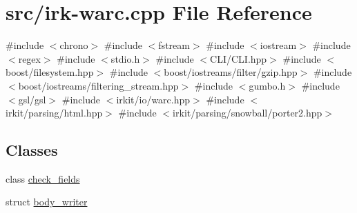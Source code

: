 \hypertarget{irk-warc_8cpp}{}\section{src/irk-\/warc.cpp File Reference}
\label{irk-warc_8cpp}
{\ttfamily \#include $<$chrono$>$}\newline
{\ttfamily \#include $<$fstream$>$}\newline
{\ttfamily \#include $<$iostream$>$}\newline
{\ttfamily \#include $<$regex$>$}\newline
{\ttfamily \#include $<$stdio.\+h$>$}\newline
{\ttfamily \#include $<$C\+L\+I/\+C\+L\+I.\+hpp$>$}\newline
{\ttfamily \#include $<$boost/filesystem.\+hpp$>$}\newline
{\ttfamily \#include $<$boost/iostreams/filter/gzip.\+hpp$>$}\newline
{\ttfamily \#include $<$boost/iostreams/filtering\+\_\+stream.\+hpp$>$}\newline
{\ttfamily \#include $<$gumbo.\+h$>$}\newline
{\ttfamily \#include $<$gsl/gsl$>$}\newline
{\ttfamily \#include $<$irkit/io/warc.\+hpp$>$}\newline
{\ttfamily \#include $<$irkit/parsing/html.\+hpp$>$}\newline
{\ttfamily \#include $<$irkit/parsing/snowball/porter2.\+hpp$>$}\newline
\subsection*{Classes}
\begin{DoxyCompactItemize}
\item 
class \mbox{\hyperlink{classcheck__fields}{check\+\_\+fields}}
\item 
struct \mbox{\hyperlink{structbody__writer}{body\+\_\+writer}}
\end{DoxyCompactItemize}

